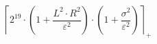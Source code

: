 \[\left\lceil 2^{19} \cdot \left(1 + \frac{L^{2} \cdot R^{2}}{\varepsilon^{2}}\right) \cdot \left(1 + \frac{\sigma^{2}}{\varepsilon^{2}}\right) \right\rceil_{+}\]
